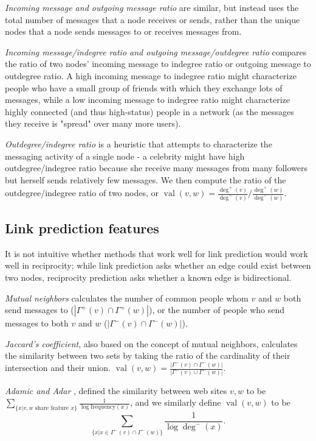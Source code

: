 \documentclass[conference]{IEEEtran}
\begin{document}
\emph{Incoming message and outgoing message ratio} are similar, but instead uses the total number of messages that a node receives or sends, rather than the unique nodes that a node sends messages to or receives messages from.

\emph{Incoming message/indegree ratio and outgoing message/outdegree ratio} compares the ratio of two nodes' incoming message to indegree ratio or outgoing message to outdegree ratio. A high incoming message to indegree ratio might characterize people who have a small group of friends with which they exchange lots of messages, while a low incoming message to indegree ratio might characterize highly connected (and thus high-status) people in a network (as the messages they receive is "spread" over many more users).

\emph{Outdegree/indegree ratio} is a heuristic that attempts to characterize the messaging activity of a single node - a celebrity might have high outdegree/indegree ratio because she receive many messages from many followers but herself sends relatively few messages. We then compute the ratio of the outdegree/indegree ratio of two nodes, or $\operatorname{val}(v,w) = \frac{\deg^+(v)}{\deg^-(v)} / \frac{\deg^+(w)}{\deg^-(w)}$.

\subsection{Link prediction features}
It is not intuitive whether methods that work well for link prediction would work well in reciprocity; while link prediction asks whether an edge could exist between two nodes, reciprocity prediction asks whether a known edge is bidirectional.

\emph{Mutual neighbors} calculates the number of common people whom $v$ and $w$ both send messages to ($|\Gamma^+(v) \cap \Gamma^+(w)|$), or the number of people who send messages to both $v$ and $w$ ($|\Gamma^-(v) \cap \Gamma^-(w)|$).

\emph{Jaccard's coefficient}, also based on the concept of mutual neighbors, calculates the similarity between two sets by taking the ratio of the cardinality of their intersection and their union. $\operatorname{val}(v,w) = \frac{|\Gamma^-(v) \cap \Gamma^-(w)|}{|\Gamma^-(v) \cup \Gamma^-(w)|}$.

\emph{Adamic and Adar} \cite{Adamic:2003ud}, defined the similarity between web sites $v,w$ to be $ \sum_{\{x|v,w \text{ share feature }x\}} \frac{1}{\log{\text{frequency}(x)}} $, and we similarly define $\operatorname{val}(v,w)$ to be \[ \sum_{\{x|x \in \Gamma^-(v) \cap \Gamma^-(w)\}} \frac{1}{\log{\deg^-(x)}} .\]
\end{document}

